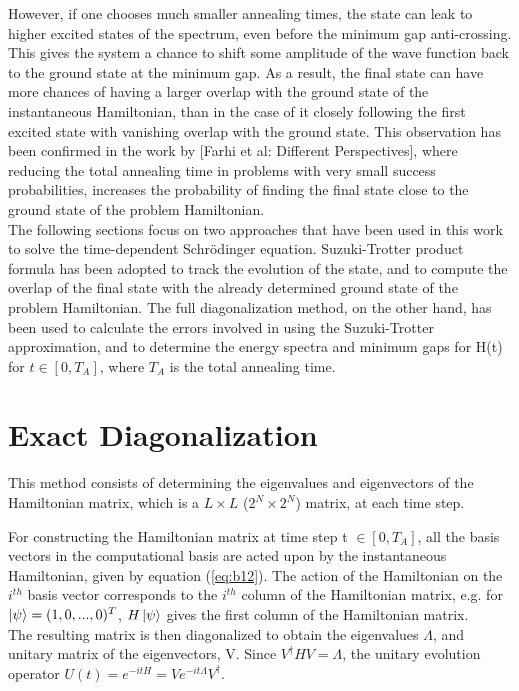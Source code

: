\documentclass[12]{article}
\begin{document}
However, if one chooses much smaller annealing times, the state can leak to higher excited states of the spectrum, even before the minimum gap anti-crossing. This gives the system a chance to shift some amplitude of the wave function back to the ground state at the minimum gap. As a result, the final state can have more chances of having a larger overlap with the ground state of the instantaneous Hamiltonian, than in the case of it closely following the first excited state with vanishing overlap with the ground state. This observation has been confirmed in the work by [Farhi et al: Different Perspectives], where reducing the total annealing time in problems with very small success probabilities, increases the probability of finding the final state close to the ground state of the problem Hamiltonian.\\

The following sections focus on two approaches that have been used in this work to solve the time-dependent Schr{\"o}dinger equation. Suzuki-Trotter product formula has been adopted to track the evolution of the state, and to compute the overlap of the final state with the already determined ground state of the problem Hamiltonian. The full diagonalization method, on the other hand, has been used to calculate the errors involved in using the Suzuki-Trotter approximation, and to determine the energy spectra and minimum gaps for H(t) for $t \in [0,T_A]$, where $T_A$ is the total annealing time.

\section{Exact Diagonalization}
This method consists of determining the eigenvalues and eigenvectors of the Hamiltonian matrix, which is a $L\times L$ ($2^N \times 2^N$) matrix, at each time step.

For constructing the Hamiltonian matrix at time step t $\in [0,T_A]$, all the basis vectors in the computational basis are acted upon by the instantaneous Hamiltonian, given by equation (\ref{eq:b12}). The action of the Hamiltonian on the $i^{th}$ basis vector corresponds to the $i^{th}$ column of the Hamiltonian matrix, e.g. for $\ket{\psi}=(1,0,...,0)^T$, $H\ket{\psi}$ gives the first column of the Hamiltonian matrix. \\
The resulting matrix is then diagonalized to obtain the eigenvalues $\Lambda$, and unitary matrix of the eigenvectors, V. Since $V^{\dagger}HV=\Lambda$, the unitary evolution operator $U(t)=e^{-itH}=Ve^{-it\Lambda}V^{\dagger}$.
\end{document}
